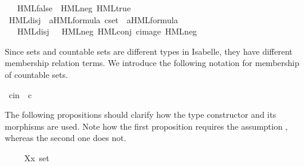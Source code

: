 \begin{isabellebody}
\isanewline
\ \ \ {\isacartoucheopen}HML{\isacharunderscore}{\kern0pt}false\ {\isasymequiv}\ HML{\isacharunderscore}{\kern0pt}neg\ HML{\isacharunderscore}{\kern0pt}true{\isacartoucheclose}\isanewline
{}\isamarkupfalse%
\ HML{\isacharunderscore}{\kern0pt}disj\ {\isacharcolon}{\kern0pt}{\isacharcolon}{\kern0pt}\ {\isacartoucheopen}{\isacharparenleft}{\kern0pt}{\isacharprime}{\kern0pt}a{\isacharparenright}{\kern0pt}HML{\isacharunderscore}{\kern0pt}formula\ cset\ {\isasymRightarrow}\ {\isacharparenleft}{\kern0pt}{\isacharprime}{\kern0pt}a{\isacharparenright}{\kern0pt}HML{\isacharunderscore}{\kern0pt}formula{\isacartoucheclose}\ %
\isamarkupcmt{$\bigvee \Phi$%
}\isanewline
\ \ \ {\isacartoucheopen}HML{\isacharunderscore}{\kern0pt}disj\ {\isasymPhi}\ {\isasymequiv}\ HML{\isacharunderscore}{\kern0pt}neg\ {\isacharparenleft}{\kern0pt}HML{\isacharunderscore}{\kern0pt}conj\ {\isacharparenleft}{\kern0pt}cimage\ HML{\isacharunderscore}{\kern0pt}neg\ {\isasymPhi}{\isacharparenright}{\kern0pt}{\isacharparenright}{\kern0pt}{\isacartoucheclose}%
\isadelimdocument
%
\endisadelimdocument
%
\isatagdocument
%
\isamarkuptrue%
%
\endisatagdocument
{\isafolddocument}%
%
\isadelimdocument
%
\endisadelimdocument
%
\begin{isamarkuptext}%
Since sets  and countable sets  are different types in Isabelle, they have different membership relation terms. We introduce the following notation for membership of countable sets.%
\end{isamarkuptext}\isamarkuptrue%
\isamarkupfalse%
\ cin\ {\isacharparenleft}{\kern0pt}{\isacartoucheopen}{\isacharunderscore}{\kern0pt}\ {\isasymin}\isactrlsub c\ {\isacharunderscore}{\kern0pt}{\isacartoucheclose}\ {\isacharbrackleft}{\kern0pt}{}{}{}{\isacharcomma}{\kern0pt}\ {}{}{}{\isacharbrackright}{\kern0pt}\ {}{}{}{\isacharparenright}{\kern0pt}%
\begin{isamarkuptext}%
The following propositions should clarify how the type constructor  and its morphisms are used. Note how the first proposition requires the assumption , whereas the second one does not.%
\end{isamarkuptext}\isamarkuptrue%
\isamarkupfalse%
\ \isanewline
\ \ \ X{\isacharcolon}{\kern0pt}{\isacharcolon}{\kern0pt}{\isacartoucheopen}{\isacharprime}{\kern0pt}x\ set{\isacartoucheclose}\isanewline

\end{isabellebody}
